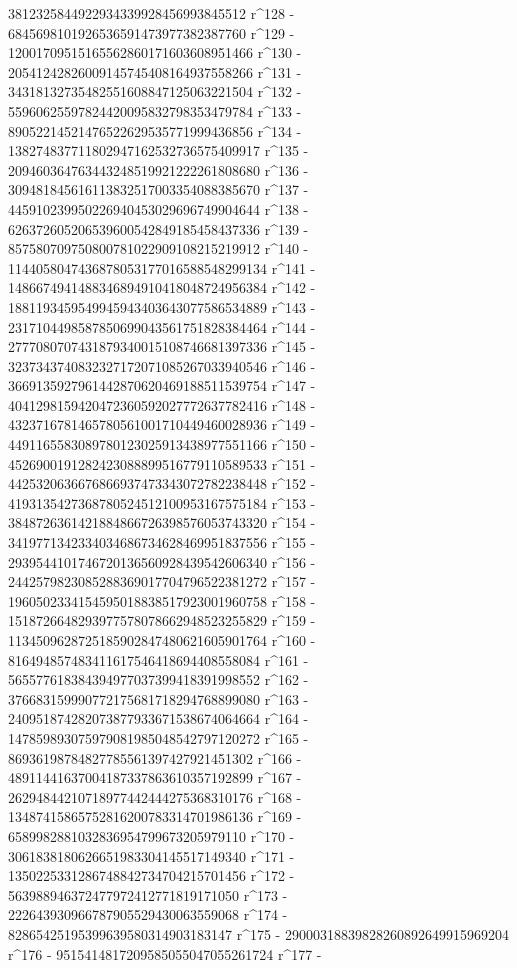        3812325844922934339928456993845512 r^128 - 
       6845698101926536591473977382387760 r^129 - 
       12001709515165562860171603608951466 r^130 - 
       20541242826009145745408164937558266 r^131 - 
       34318132735482551608847125063221504 r^132 - 
       55960625597824420095832798353479784 r^133 - 
       89052214521476522629535771999436856 r^134 - 
       138274837711802947162532736575409917 r^135 - 
       209460364763443248519921222261808680 r^136 - 
       309481845616113832517003354088385670 r^137 - 
       445910239950226940453029696749904644 r^138 - 
       626372605206539600542849185458437336 r^139 - 
       857580709750800781022909108215219912 r^140 - 
       1144058047436878053177016588548299134 r^141 - 
       1486674941488346894910418048724956384 r^142 - 
       1881193459549945943403643077586534889 r^143 - 
       2317104498587850699043561751828384464 r^144 - 
       2777080707431879340015108746681397336 r^145 - 
       3237343740832327172071085267033940546 r^146 - 
       3669135927961442870620469188511539754 r^147 - 
       4041298159420472360592027772637782416 r^148 - 
       4323716781465780561001710449460028936 r^149 - 
       4491165583089780123025913438977551166 r^150 - 
       4526900191282423088899516779110589533 r^151 - 
       4425320636676866937473343072782238448 r^152 - 
       4193135427368780524512100953167575184 r^153 - 
       3848726361421884866726398576053743320 r^154 - 
       3419771342334034686734628469951837556 r^155 - 
       2939544101746720136560928439542606340 r^156 - 
       2442579823085288369017704796522381272 r^157 - 
       1960502334154595018838517923001960758 r^158 - 
       1518726648293977578078662948523255829 r^159 - 
       1134509628725185902847480621605901764 r^160 - 
       816494857483411617546418694408558084 r^161 - 
       565577618384394977037399418391998552 r^162 - 
       376683159990772175681718294768899080 r^163 - 
       240951874282073877933671538674064664 r^164 - 
       147859893075979081985048542797120272 r^165 - 
       86936198784827785561397427921451302 r^166 - 
       48911441637004187337863610357192899 r^167 - 
       26294844210718977442444275368310176 r^168 - 
       13487415865752816200783314701986136 r^169 - 
       6589982881032836954799673205979110 r^170 - 
       3061838180626651983304145517149340 r^171 - 
       1350225331286748842734704215701456 r^172 - 
       563988946372477972412771819171050 r^173 - 
       222643930966787905529430063559068 r^174 - 
       82865425195399639580314903183147 r^175 - 
       29000318839828260892649915969204 r^176 - 
       9515414817209585055047055261724 r^177 - 
